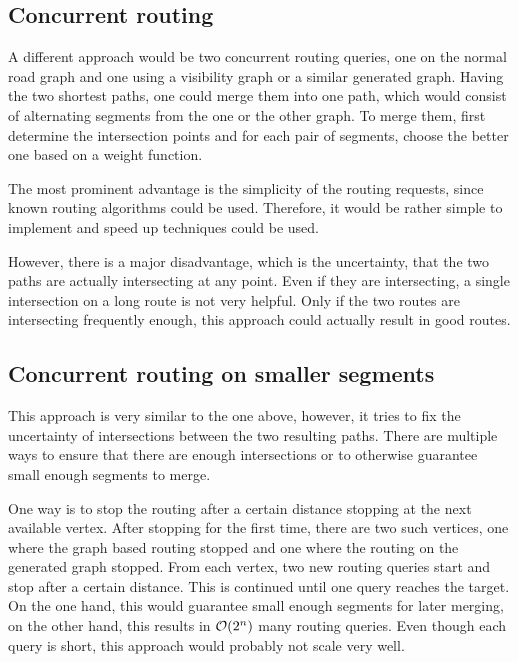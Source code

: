 	\subsection{Concurrent routing}
	
		A different approach would be two concurrent routing queries, one on the normal road graph and one using a visibility graph or a similar generated graph.
		Having the two shortest paths, one could merge them into one path, which would consist of alternating segments from the one or the other graph.
		To merge them, first determine the intersection points and for each pair of segments, choose the better one based on a weight function.
		
		The most prominent advantage is the simplicity of the routing requests, since known routing algorithms could be used.
		Therefore, it would be rather simple to implement and speed up techniques could be used.
		
		However, there is a major disadvantage, which is the uncertainty, that the two paths are actually intersecting at any point.
		Even if they are intersecting, a single intersection on a long route is not very helpful.
		Only if the two routes are intersecting frequently enough, this approach could actually result in good routes.
	
	\subsection{Concurrent routing on smaller segments}
	
		This approach is very similar to the one above, however, it tries to fix the uncertainty of intersections between the two resulting paths.
		There are multiple ways to ensure that there are enough intersections or to otherwise guarantee small enough segments to merge.
		
		One way is to stop the routing after a certain distance stopping at the next available vertex.
		After stopping for the first time, there are two such vertices, one where the graph based routing stopped and one where the routing on the generated graph stopped.
		From each vertex, two new routing queries start and stop after a certain distance.
		This is continued until one query reaches the target.
		On the one hand, this would guarantee small enough segments for later merging, on the other hand, this results in $\mathcal{O}(2^n)$ many routing queries.
		Even though each query is short, this approach would probably not scale very well.
		
